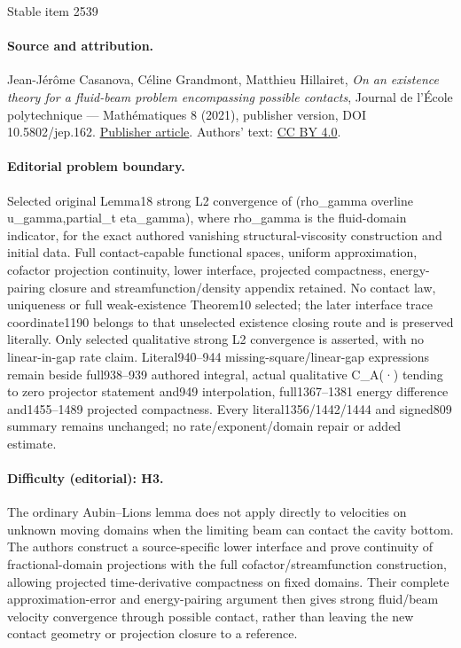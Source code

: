 \documentclass[11pt]{article}
\theoremstyle{remark}
\theoremstyle{definition}
\begin{document}
\begin{center}{\Large Stable item 2539}\end{center}
\paragraph{Source and attribution.}
Jean-Jérôme Casanova, Céline Grandmont, Matthieu Hillairet, \emph{On an existence theory for a fluid-beam problem encompassing possible contacts}, Journal de l’École polytechnique — Mathématiques 8 (2021), publisher version, DOI 10.5802/jep.162. \href{https://jep.centre-mersenne.org/articles/10.5802/jep.162/}{Publisher article}. Authors' text: \href{https://creativecommons.org/licenses/by/4.0/}{CC BY 4.0}.
\paragraph{Editorial problem boundary.}
Selected original Lemma18 strong L2 convergence of (rho\_gamma overline u\_gamma,partial\_t eta\_gamma), where rho\_gamma is the fluid-domain indicator, for the exact authored vanishing structural-viscosity construction and initial data. Full contact-capable functional spaces, uniform approximation, cofactor projection continuity, lower interface, projected compactness, energy-pairing closure and streamfunction/density appendix retained. No contact law, uniqueness or full weak-existence Theorem10 selected; the later interface trace coordinate1190 belongs to that unselected existence closing route and is preserved literally. Only selected qualitative strong L2 convergence is asserted, with no linear-in-gap rate claim. Literal940–944 missing-square/linear-gap expressions remain beside full938–939 authored integral, actual qualitative C\_A(·) tending to zero projector statement and949 interpolation, full1367–1381 energy difference and1455–1489 projected compactness. Every literal1356/1442/1444 and signed809 summary remains unchanged; no rate/exponent/domain repair or added estimate.
\paragraph{Difficulty (editorial): H3.}
The ordinary Aubin–Lions lemma does not apply directly to velocities on unknown moving domains when the limiting beam can contact the cavity bottom. The authors construct a source-specific lower interface and prove continuity of fractional-domain projections with the full cofactor/streamfunction construction, allowing projected time-derivative compactness on fixed domains. Their complete approximation-error and energy-pairing argument then gives strong fluid/beam velocity convergence through possible contact, rather than leaving the new contact geometry or projection closure to a reference.
\end{document}
